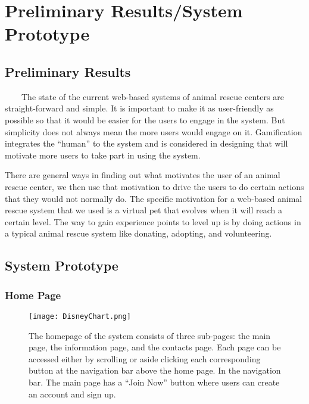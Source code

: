 \chapter{Preliminary Results/System Prototype}
\section{Preliminary Results}
~~~~The state of the current web-based systems of animal rescue centers are straight-forward and simple. It is important to make it as user-friendly as possible so that it would be easier for the users to engage in the system. But simplicity does not always mean the more users would engage on it. Gamification integrates the “human” to the system and is considered in designing that will motivate more users to take part in using the system.

There are general ways in finding out what motivates the user of an animal rescue center, we then use that motivation to drive the users to do certain actions that they would not normally do. The specific motivation for a web-based animal rescue system that we used is a virtual pet that evolves when it will reach a certain level. The way to gain experience points to level up is by doing actions in a typical animal rescue system like donating, adopting, and volunteering. 

\section{System Prototype}

\subsection{Home Page}
\begin{figure}[H]                %
	\centering                    %
	\texttt{[image: DisneyChart.png]}      %
	\caption{
		The homepage of the system consists of three sub-pages: the main page, the information page, and the contacts page. Each page can be accessed either by scrolling or aside clicking each corresponding button at the navigation bar above the home page. In the navigation bar. The main page has a “Join Now” button where users can create an account and sign up.}
	\label{fig:Index}
\end{figure}

